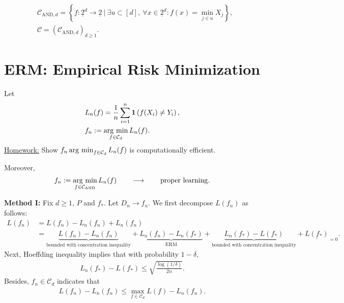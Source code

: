 \documentclass[twoside]{article}
\begin{document}
\begin{remark}[Example]
        \begin{align*}
            & \mathcal{C}_{\text{AND},d}= \left\{  f:   \underline{2}^d \rightarrow \underline{2}\ | \ \exists u \subset[d],\ \forall x\in \underline{2}^d: f(x) = \min_{j\in u} X_j \right\},
            \\
            & \mathcal{C} = \left( \mathcal{C}_{\text{AND},d}\right)_{d\ge 1}.
        \end{align*}
\end{remark}

\section{ERM: Empirical Risk Minimization}

Let
\begin{align*}
    & L_n(f) = \frac{1}{n} \sum_{i=1}^n \mathbf{1}\left( f(X_i) \ne Y_i  \right),
    \\& f_n:= \operatorname*{arg\ min}_{f\in \mathcal{C}_d} L_n(f).
\end{align*}
\underline{Homework:} Show $f_n \operatorname*{arg\ min}_{f\in \mathcal{C}_d} L_n(f)$ is computationally efficient.

Moreover,
\begin{align*}
    f_n:= \operatorname*{arg\ min}_{f\in \mathcal{C}_{\text{AND}}} L_n(f)  \qquad \longrightarrow \qquad \text{proper learning.}
\end{align*}

\noindent
\textbf{Method I:}
Fix $d\ge 1$, $P$ and $f_*$. Let $D_n\rightarrow f_n$. We first decompose $L(f_n)$ as follows:
\begin{align*}
    L(f_n)
    & = L(f_n) - L_n(f_n) + L_n(f_n)
    \\& = \underbrace{ L(f_n) - L_n(f_n) }_{\text{bounded with concentration inequality}}
        + \underbrace{ L_n(f_n) - L_n(f_*) }_{\text{ERM}}
        + \underbrace{ L_n(f_*) - L(f_*)  }_{\text{bounded with concentration inequality}}
        + \underline{L(f_*)}_{=0}.
\end{align*}
Next, Hoeffding inequality implies that with probability $1-\delta$,
\begin{align*}
    L_n(f_*) - L(f_*) \le  \sqrt{\frac{ \log(1/\delta) }{2n} }.
\end{align*}
Besides, $f_n\in \mathcal{C}_d$ indicates that
\begin{align*}
    L(f_n) - L_n(f_n) \le \max_{ f\in \mathcal{C}_d } L(f) - L_n(f_n).
\end{align*}
\end{document}
